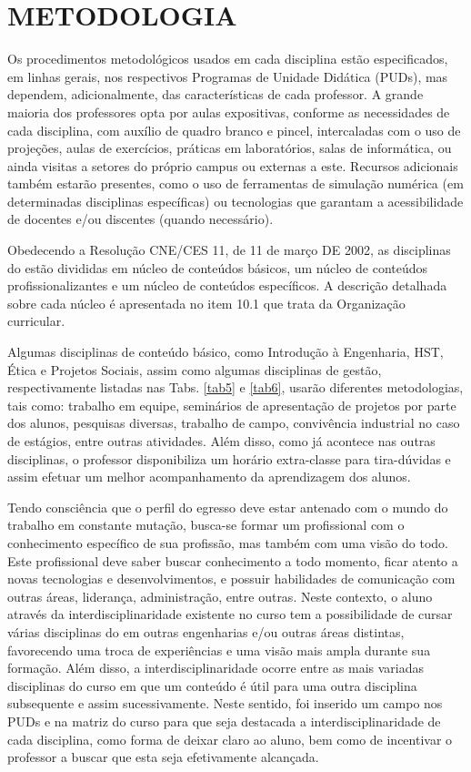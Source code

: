 \clearpage\section{METODOLOGIA}
Os procedimentos metodológicos usados em cada disciplina estão especificados, em linhas gerais, nos respectivos Programas de Unidade Didática (PUDs), mas dependem, adicionalmente, das características de cada professor. A grande maioria dos professores opta por aulas expositivas, conforme as necessidades de cada disciplina, com auxílio de quadro branco e pincel, intercaladas com o uso de projeções, aulas de exercícios, práticas em laboratórios, salas de informática, ou ainda visitas a setores do próprio campus ou externas a este. Recursos adicionais também estarão presentes, como o uso de ferramentas de simulação numérica (em determinadas disciplinas específicas) ou tecnologias que garantam a acessibilidade de docentes e/ou discentes (quando necessário).

Obedecendo a Resolução CNE/CES 11, de 11 de março DE 2002, as disciplinas do \NOMECURSO estão divididas em núcleo de conteúdos básicos, um núcleo de conteúdos profissionalizantes e um núcleo de conteúdos específicos. A descrição detalhada sobre cada núcleo é apresentada no item 10.1 que trata da Organização curricular.

Algumas disciplinas de conteúdo básico, como Introdução à Engenharia, HST, Ética e Projetos Sociais, assim como algumas disciplinas de gestão, respectivamente listadas nas Tabs. \ref{tab5} e \ref{tab6}, usarão diferentes metodologias, tais como: trabalho em equipe, seminários de apresentação de projetos por parte dos alunos, pesquisas diversas, trabalho de campo, convivência industrial no caso de estágios, entre outras atividades. Além disso, como já acontece nas outras disciplinas, o professor disponibiliza um horário extra-classe para tira-dúvidas e assim efetuar um melhor acompanhamento da aprendizagem dos alunos.

Tendo consciência que o perfil do egresso deve estar antenado com o mundo do trabalho em constante mutação, busca-se formar um profissional com o conhecimento específico de sua profissão, mas também com uma visão do todo. Este profissional deve saber buscar conhecimento a todo momento, ficar atento a novas tecnologias e desenvolvimentos, e possuir habilidades de comunicação com outras áreas, liderança, administração, entre outras. Neste contexto, o aluno através da interdisciplinaridade existente no curso tem a possibilidade de cursar várias disciplinas do \NOMECURSO em outras engenharias e/ou outras áreas distintas, favorecendo uma troca de experiências e uma visão mais ampla durante sua formação. Além disso, a interdisciplinaridade ocorre entre as mais variadas disciplinas do curso em que um conteúdo é útil para uma outra disciplina subsequente e assim sucessivamente. Neste sentido, foi inserido um campo nos PUDs e na matriz do curso para que seja destacada a interdisciplinaridade de cada disciplina, como forma de deixar claro ao aluno, bem como de incentivar o professor a buscar que esta seja efetivamente alcançada.

